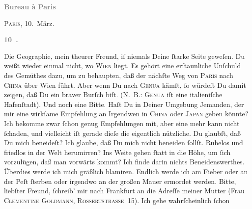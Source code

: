 \begin{ledgroupsized}[t]{13cm}
           \pstart
           \begin{otherlanguage}{french}\textcolor{gray}{\textbf{\textbf{Bureau à Paris}}}\end{otherlanguage}\hfill \textsc{Paris}, 10. März.\pend
           \pstart
           \begin{otherlanguage}{french}\textcolor{gray}{\textbf{\textbf{10 .}}}\end{otherlanguage}\pend
           \pstart
           Die Geographie, mein theurer Freund, iſ niemals Deine
               ſtarke Seite geweſen. Du weißt wieder einmal nicht, wo \textsc{Wien} liegt. Es gehört eine erſtaunliche Unſchuld des Gemüthes dazu, um zu behaupten,
               daß der nächſte Weg von \textsc{Paris} nach \textsc{China} über Wien führt. Aber wenn Du nach \textsc{Genua} kämſt, ſo würdeſt Du damit zeigen, daß Du ein braver Burſch biſt. \introOben{}(\textsc{N. B.: Genua} iſt eine italieniſche
                  Hafenſtadt).\introOben{}\pend
           \pstart
            Und noch eine Bitte. Haſt Du in Deiner Umgebung Jemanden, {\pb}der mir eine wirkſame Empfehlung an Irgendwen in \textsc{China} oder \textsc{Japan} geben könnte? Ich bekomme zwar ſchon genug Empfehlungen mit, aber eine mehr
               kann nicht ſchaden, und vielleicht iſt gerade dieſe die eigentlich\strikeout{\textcolor{gray}{e}} nützliche.\pend
           \pstart
           Du glaubſt, daß Du mich beneideſt? Ich glaube, daß Du mich nicht beneiden ſollſt.
               Ruhelos und friedlos in der Welt herumirren?  Ins Weite gehen ſtatt in die Höhe, um ſich
               vorzulügen, daß man {\pb}vorwärts kommt? Ich finde darin
               nichts Beneidenswerthes. Überdies werde ich mich gräßlich  blamiren. Endlich werde ich \strikeout{\textcolor{gray}{a}} am Fieber \introOben{}oder\introOben{} an der Peſt  ſterben oder irgendwo an der großen Mauer ermordet werden.\pend
           \pstart
           Bitte, liebſter Freund, ſchreib’ mir nach Frankfurt an die Adreſſe meiner Mutter (Frau \textsc{Clementine Goldmann}, \textsc{Rossertstraße} 15). Ich gehe wahrſcheinlich ſchon

\end{ledgroupsized}
